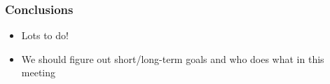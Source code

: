 \documentclass[compress]{beamer}
\begin{document}


\begin{frame}
\frametitle{Conclusions}
\begin{itemize}
\item Lots to do!
\item We should figure out short/long-term goals and who does what in this meeting
\end{itemize}
\label{numpages}
\end{frame}
\end{document}
